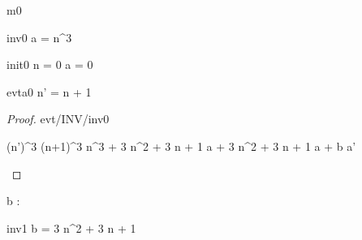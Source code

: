 \documentclass[12pt]{amsart}
\title{}
\author{}
\date{} %
\begin{document}
\maketitle
\tableofcontents


\begin{machine}{m0}


\begin{invariant}{inv0}
	a = n^3
\end{invariant}

%	


\begin{initialization}{init0}
	n = 0 \land a = 0
\end{initialization}

\begin{evassignment}{evt}{a0}
	n' = n + 1
\end{evassignment}

\begin{proof}{evt/INV/inv0}
	\begin{calculation}
		(n')^3
	\hint{=}{ \ref{a0} }
		(n+1)^3
		n^3 + 3 \cdot n^2 + 3 \cdot n + 1
	\hint{=}{ \ref{inv0} }
		a + 3 \cdot n^2 + 3 \cdot n + 1
	\hint{=}{ \ref{inv1} }
		a + b
	\hint{=}{ \ref{a1} }
		a'
	\end{calculation}
\end{proof}

\begin{variable}
	b : \Int
\end{variable}

\begin{invariant}{inv1}
	b = 3 \cdot n^2 + 3 \cdot n + 1
\end{invariant}


\end{machine}
\end{document}
